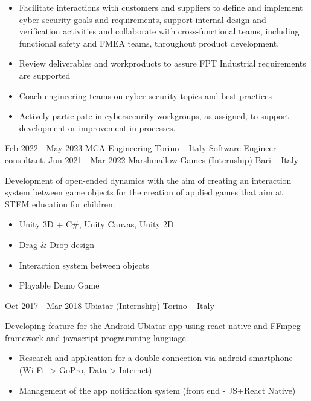 \documentclass[]{twentysecondcv}
\begin{document}
\begin{twenty}
{\begin{itemize}
			\item Facilitate interactions with customers and suppliers to define and implement cyber security goals and requirements, support internal design and verification activities and collaborate with cross-functional teams, including functional safety and FMEA teams, throughout product development.
			\item Review deliverables and workproducts to assure FPT Industrial requirements are supported
			\item Coach engineering teams on cyber security topics and best practices
			\item Actively participate in cybersecurity workgroups, as assigned, to support development or improvement in processes.
		\end{itemize}
	}
	\twentyitem
	{Feb 2022 - May 2023}
	{\href{https://mca-groupe.com/}{MCA Engineering}}
	{Torino – Italy}
	{Software Engineer consultant.}
	\twentyitem
	{Jun 2021 - Mar 2022}
	{Marshmallow Games {\scriptsize(Internship)}}
	{Bari – Italy}
	{Development of open-ended dynamics with the aim of creating an interaction system between game objects for the creation of applied games that aim at STEM education for children.
		\begin{itemize}		
			\item Unity 3D + C\#,  Unity Canvas, Unity 2D
			\item  Drag \& Drop design%
			\item Interaction system between objects%
			\item Playable Demo Game
		\end{itemize}
	}
	\twentyitem
	{Oct 2017 - Mar 2018}
	{\href{https://ubiatar.com/}{Ubiatar {\scriptsize(Internship)}}}
	{Torino – Italy}
	{Developing feature for the Android Ubiatar app using react native and FFmpeg framework and javascript programming language.
	\begin{itemize}		
		\item  Research and application for a double connection via android smartphone (Wi-Fi -> GoPro, Data-> Internet)
		\item Management of the app notification system (front end - JS+React Native)
	\end{itemize}
	}

\end{twenty}
\end{document}
